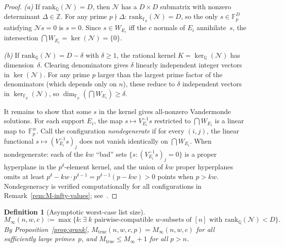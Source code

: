 \documentclass[11pt]{article}
\newtheorem{definition}[theorem]{Definition}
\newcommand{\FF}{\mathbb{F}}
\newcommand{\ZZ}{\mathbb{Z}}
\newcommand{\QQ}{\mathbb{Q}}
\begin{document}
\begin{proof}
\emph{(a)} If $\mathrm{rank}_\QQ(\mathcal{N}) = D$, then $\mathcal{N}$ has a $D \times D$ submatrix with nonzero determinant $\Delta \in \ZZ$.  For any prime $p \nmid \Delta$: $\mathrm{rank}_{\FF_p}(\mathcal{N}) = D$, so the only $s \in \FF_p^D$ satisfying $\mathcal{N} s = 0$ is $s = 0$.  Since $s \in W_{E_i}$ iff the $c$ normals of $E_i$ annihilate~$s$, the intersection $\bigcap W_{E_i} = \ker(\mathcal{N}) = \{0\}$.

\emph{(b)} If $\mathrm{rank}_\QQ(\mathcal{N}) = D - \delta$ with $\delta \geq 1$, the rational kernel $K = \ker_\QQ(\mathcal{N})$ has dimension~$\delta$.  Clearing denominators gives $\delta$ linearly independent integer vectors in $\ker(\mathcal{N})$.  For any prime $p$ larger than the largest prime factor of the denominators (which depends only on $n$), these reduce to $\delta$ independent vectors in $\ker_{\FF_p}(\mathcal{N})$, so $\dim_{\FF_p}(\bigcap W_{E_i}) \geq \delta$.

It remains to show that some $s$ in the kernel gives all-nonzero Vandermonde solutions.  For each support $E_i$, the map $s \mapsto V_{E_i}^{-1} s$ restricted to $\bigcap W_{E_i}$ is a linear map to~$\FF_p^w$.  Call the configuration \emph{nondegenerate} if for every $(i, j)$, the linear functional $s \mapsto (V_{E_i}^{-1} s)_j$ does not vanish identically on $\bigcap W_{E_i}$.  When nondegenerate: each of the $kw$ ``bad'' sets $\{s : (V_{E_i}^{-1} s)_j = 0\}$ is a proper hyperplane in the $p^\delta$-element kernel, and the union of $kw$ proper hyperplanes omits at least $p^\delta - kw \cdot p^{\delta-1} = p^{\delta-1}(p - kw) > 0$ points when $p > kw$.  Nondegeneracy is verified computationally for all configurations in Remark~\ref{rem:M-infty-values}; see~\cite{CompanionRepo}.
\end{proof}

\begin{definition}[Asymptotic worst-case list size]
\label{def:M-infty}
$$M_\infty(n, w, c) := \max\bigl\{k : \exists\; k \text{ pairwise-compatible } w\text{-subsets of } [n] \text{ with } \mathrm{rank}_\QQ(\mathcal{N}) < D\bigr\}.$$
By Proposition~\ref{prop:qrank}, $M_{\mathrm{true}}(n, w, c, p) = M_\infty(n, w, c)$ for all sufficiently large primes~$p$, and $M_{\mathrm{true}} \leq M_\infty + 1$ for all $p > n$.
\end{definition}
\end{document}
